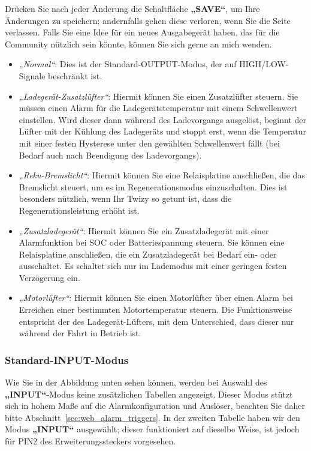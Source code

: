 Drücken Sie nach jeder Änderung die Schaltfläche \textbf{„SAVE“}, um Ihre Änderungen zu speichern; andernfalls gehen diese verloren, wenn Sie die Seite verlassen.
Falls Sie eine Idee für ein neues Ausgabegerät haben, das für die Community nützlich sein könnte, können Sie sich gerne an mich wenden.\\

\begin{itemize}
    \item \textit{„Normal“}: Dies ist der Standard-OUTPUT-Modus, der auf HIGH/LOW-Signale beschränkt ist.
    \item \textit{„Ladegerät-Zusatzlüfter“}: Hiermit können Sie einen Zusatzlüfter steuern. 
    Sie müssen einen Alarm für die Ladegerätstemperatur mit einem Schwellenwert einstellen. Wird dieser dann während des Ladevorgangs 
    ausgelöst, beginnt der Lüfter mit der Kühlung des Ladegeräts und stoppt erst, wenn die Temperatur
    mit einer festen Hysterese unter den gewählten Schwellenwert fällt (bei Bedarf auch nach Beendigung des Ladevorgangs).
    \item \textit{„Reku-Bremslicht“}: Hiermit können Sie eine Relaisplatine anschließen, die
    das Bremslicht steuert, um es im Regenerationsmodus einzuschalten. Dies ist besonders
    nützlich, wenn Ihr Twizy so getunt ist, dass die Regenerationsleistung erhöht ist.
    \item \textit{„Zusatzladegerät“}: Hiermit können Sie ein Zusatzladegerät mit einer
    Alarmfunktion bei SOC oder Batteriespannung steuern. Sie können eine Relaisplatine anschließen, die ein
    Zusatzladegerät bei Bedarf ein- oder ausschaltet. Es schaltet sich nur im Lademodus mit einer geringen festen Verzögerung ein.
    \item \textit{„Motorlüfter“}: Hiermit können Sie einen Motorlüfter über einen Alarm bei Erreichen einer bestimmten Motortemperatur steuern.
    Die Funktionsweise entspricht der des Ladegerät-Lüfters, mit dem Unterschied, dass dieser nur während der Fahrt in Betrieb ist.
\end{itemize}

\subsubsection{Standard-INPUT-Modus}

Wie Sie in der Abbildung unten sehen können, werden bei Auswahl des \textbf{„INPUT“}-Modus keine zusätzlichen Tabellen angezeigt.
Dieser Modus stützt sich in hohem Maße auf die Alarmkonfiguration und Auslöser, beachten Sie daher bitte Abschnitt~\ref{sec:web_alarm_triggers}.
In der zweiten Tabelle haben wir den Modus \textbf{„INPUT“} ausgewählt; dieser funktioniert auf dieselbe Weise, ist jedoch für PIN2 des Erweiterungssteckers vorgesehen.

